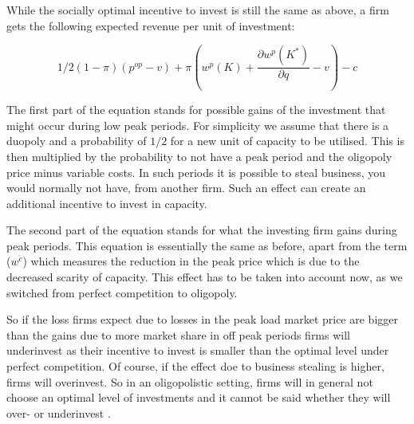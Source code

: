 While the socially optimal incentive to invest is still the same as above, a firm gets the following expected revenue per unit of investment:

\begin{equation}
	1/2 (1-\pi) (p^{op}-v) + \pi (w^p(K)+\frac{\partial w^p(K^*)}{\partial q}-v) - c
\end{equation}

The first part of the equation stands for possible gains of the investment that might occur during low peak periods. For simplicity we assume that there is a duopoly and a probability of $1/2$ for a new unit of capacity to be utilised. This is then multiplied by the probability to not have a peak period and the oligopoly price minus variable costs. In such periods it is possible to steal business, you would normally not have, from another firm. Such an effect can create an additional incentive to invest in capacity. %

The second part of the equation stands for what the investing firm gains during peak periods. This equation is essentially the same as before, apart from the term ($w^{\acute{c}}$) which measures the reduction in the peak price which is due to the decreased scarity of capacity. This effect has to be taken into account now, as we switched from perfect competition to oligopoly.

So if the loss firms expect due to losses in the peak load market price are bigger than the gains due to more market share in off peak periods firms will underinvest as their incentive to invest is smaller than the optimal level under perfect competition. Of course, if the effect doe to business stealing is higher, firms will overinvest. So in an oligopolistic setting, firms will in general not choose an optimal level of investments and it cannot be said whether they will over- or underinvest \citep[see][]{Fehr1995}.%


